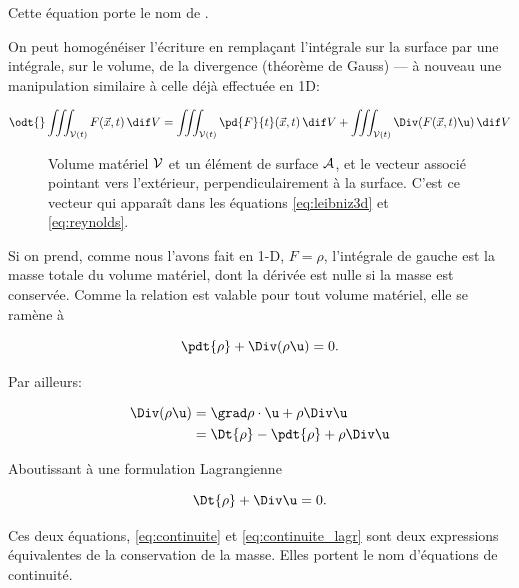 Cette équation porte le nom de . 

On peut homogénéiser l'écriture en remplaçant l'intégrale sur la surface par une intégrale, sur le volume, de la divergence (théorème de Gauss) --- à nouveau une manipulation similaire à celle déjà effectuée en 1D: 

\begin{equation*}
  \odt{}
  \iiint_{\vol(t)} F(\vec{x},t)\,\dif V = 
  \iiint_{\vol(t)} \pd{F}{t}(\vec{x},t)\,\dif V +
  \iiint_{\vol(t)} \Div (F(\vec{x},t)\u)\,\dif V
  \label{eq:reynolds_integral}
\end{equation*}
 
\begin{figure}
  \begin{center}
   
  \end{center}
  \caption{Volume matériel $\mathcal{V}$ et un élément de surface $\mathcal{A}$, et le vecteur associé pointant vers l'extérieur, perpendiculairement à la surface. C'est ce vecteur qui apparaît dans les équations \eqref{eq:leibniz3d} et \eqref{eq:reynolds}.  }\label{fig:volumelemt}
\end{figure}

 Si on prend, comme nous l'avons fait en 1-D, $F=\rho$, l'intégrale de gauche est la masse totale du volume matériel, dont la dérivée est nulle si la masse est conservée. Comme la relation est valable pour tout volume matériel, elle se ramène à 

 \begin{equation}
   \pdt{\rho} + \Div (\rho \u) = 0.
   \label{eq:continuite}
 \end{equation}

 Par ailleurs:


 \begin{displaymath}
   \begin{split}
     \Div (\rho \u) &= \grad \rho \cdot \u + \rho  \Div \u \\
                    &= \Dt{\rho} - \pdt{\rho} + \rho  \Div \u
   \end{split}
 \end{displaymath}

 Aboutissant à une formulation Lagrangienne

%
\begin{equation}
   \Dt{\rho} + \Div \u = 0.
   \label{eq:continuite_lagr}
\end{equation}

Ces deux équations, \ref{eq:continuite} et \ref{eq:continuite_lagr} sont deux expressions équivalentes de la conservation de la masse. Elles portent le nom d'équations de continuité. 

